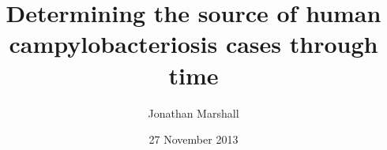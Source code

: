 \documentclass[]{beamer}
\begin{document}
\newcommand{\gap}{\vspace{0.5cm}}
\newcommand\BackgroundPicture[1]{%
	\setbeamertemplate{background}{%
	\parbox[c][\paperheight]{\paperwidth}{%
	\vfill \hfill
	\texttt{[image: \#1]}
	\hfill \vfill}}
}
\newcommand\FullScreen[1]{
	\BackgroundPicture{#1}
	\begin{frame}
	\end{frame}
	\setbeamertemplate{background}{}
}
\newcommand\simonbox[2]{
	\begin{beamercolorbox}[sep=2mm,center,rounded=true,shadow=true]{#2}
	#1
	\gap
	\end{beamercolorbox}
}
\newcommand\tightsimonbox[3]{
	\begin{beamercolorbox}[wd=#3pt,ht=10pt,dp=5pt,sep=0pt,center,rounded=true,header=false]{#2}
	#1
	\end{beamercolorbox}
}
\newcommand\tightbox[4]{
	\begin{beamercolorbox}[wd=#3pt,ht=#4pt,dp=5pt,sep=0pt,center,rounded=true,header=false]{#2}
	#1
	\end{beamercolorbox}
}



\begin{frame}
\title{Determining the source of human campylobacteriosis cases through time\gap}
\author{Jonathan Marshall}
\date{27 November 2013}
\titlepage
\end{frame}

\end{document}

